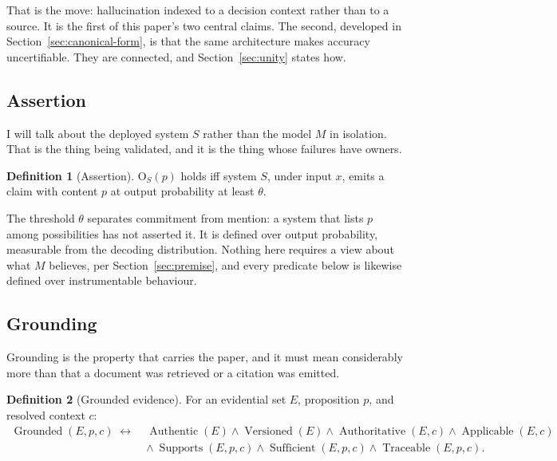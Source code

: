 \documentclass[11pt]{article}
\newcommand{\Out}{\mathrm{O}}          %
\newcommand{\Supports}{\operatorname{Supports}}
\newcommand{\Applicable}{\operatorname{Applicable}}
\newcommand{\Authentic}{\operatorname{Authentic}}
\newcommand{\Traceable}{\operatorname{Traceable}}
\newcommand{\Grounded}{\operatorname{Grounded}}
\newcommand{\Versioned}{\operatorname{Versioned}}
\newcommand{\Authoritative}{\operatorname{Authoritative}}
\newcommand{\Sufficient}{\operatorname{Sufficient}}
\theoremstyle{plain}
\theoremstyle{definition}
\newtheorem{definition}{Definition}
\begin{document}
That is the move: hallucination indexed to a decision context rather than to a
source. It is the first of this paper's two central claims. The second, developed in
Section~\ref{sec:canonical-form}, is that the same architecture makes accuracy
uncertifiable. They are connected, and Section~\ref{sec:unity} states how.

\subsection{Assertion}

I will talk about the deployed system $S$ rather than the model $M$ in isolation.
That is the thing being validated, and it is the thing whose failures have owners.

\begin{definition}[Assertion]
\label{def:assertion}
$\Out_S(p)$ holds iff system $S$, under input $x$, emits a claim with content $p$
at output probability at least $\theta$.
\end{definition}

The threshold $\theta$ separates commitment from mention: a system that lists $p$
among possibilities has not asserted it. It is defined over output probability,
measurable from the decoding distribution. Nothing here requires a view about what
$M$ believes, per Section~\ref{sec:premise}, and every predicate below is likewise
defined over instrumentable behaviour.

\subsection{Grounding}
\label{sec:grounding-def}

Grounding is the property that carries the paper, and it must mean considerably
more than that a document was retrieved or a citation was emitted.

\begin{definition}[Grounded evidence]
\label{def:grounded-evidence}
For an evidential set $E$, proposition $p$, and resolved context $c$:
\begin{equation}
  \begin{aligned}
  \Grounded(E, p, c) \;\leftrightarrow\;
    &\Authentic(E) \wedge \Versioned(E) \wedge \Authoritative(E, c)
      \wedge \Applicable(E, c)\\
    &\wedge\ \Supports(E, p, c) \wedge \Sufficient(E, p, c)
      \wedge \Traceable(E, p, c).
  \end{aligned}
  \label{eq:grounded}
\end{equation}
\end{definition}
\end{document}
